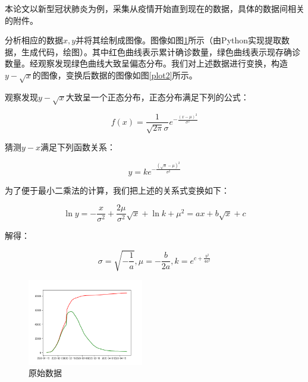 \documentclass{article}
\begin{document}
\begin{multicols}{2}
                本论文以新型冠状肺炎为例，采集从疫情开始直到现在的数据，具体的数据间相关的附件。

                分析相应的数据$x,y$并将其绘制成图像。图像如图\ref{plot1}所示（由Python实现提取数据，生成代码，绘图）。其中红色曲线表示累计确诊数量，绿色曲线表示现存确诊数量。经观察发现绿色曲线大致呈偏态分布。我们对上述数据进行变换，构造$y-\sqrt{x}$的图像，变换后数据的图像如图\ref{plot2}所示。

                观察发现$y-\sqrt{x}$大致呈一个正态分布，正态分布满足下列的公式：

                \begin{equation}
                    f(x)=\frac{1}{\sqrt{2\pi}\sigma}e^{-\frac{(x-\mu)^2}{\sigma^2}}
                \end{equation}

                猜测$y-x$满足下列函数关系：

                \begin{equation}
                    y = ke^{-\frac{(\sqrt{x}-\mu)^2}{\sigma^2}}
                    \label{z4}
                \end{equation}

                为了便于最小二乘法的计算，我们把上述的关系式变换如下：

                \begin{equation}
                    \ln{y}=-\frac{x}{\sigma^2}+\frac{2\mu}{\sigma^2}\sqrt{x}+\ln{k}+\mu^2=ax+b\sqrt{x}+c
                    \label{z5}
                \end{equation}

                解得：

                \begin{equation}
                    \sigma=\sqrt{-\frac{1}{a}},
                    \mu=-\frac{b}{2a},
                    k = e^{c+\frac{b^2}{4a^2}}
                    \label{z6}
                \end{equation}

                \begin{figure}[H]
                    \centering
                    \includegraphics[width=0.45\textwidth]{plot1.png}
                    \caption{原始数据}
                    \label{plot1}
                \end{figure}


\end{multicols}
\end{document}

